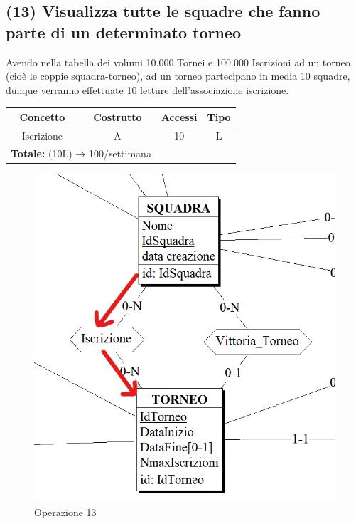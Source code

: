 \documentclass[a4paper,12pt]{report}
\begin{document}
\subsection*{(13)  Visualizza tutte le squadre che fanno parte di un determinato torneo}
Avendo nella tabella dei volumi 10.000 Tornei e 100.000 Iscrizioni ad un torneo (cioè le coppie squadra-torneo), ad un torneo partecipano in media 10 squadre, dunque verranno effettuate 10 letture dell'associazione iscrizione.
\begin{center}
	\begin{tabular}{|c|c|c|c|}
		\hline\rowcolor{pink}
		Concetto & Costrutto & Accessi & Tipo\\
		\hline\hline		
		Iscrizione & A & 10 & L\\
		\hline
		\multicolumn{2}{l}{%
			\textbf{Totale:} (10L) → 100/settimana} \\
		\hline
	\end{tabular}
\end{center}
\begin{figure}[!htb]
	\centerline{\includegraphics[scale=0.6]{img/op13.png}}
	\caption{Operazione 13}
\end{figure}
\end{document}
